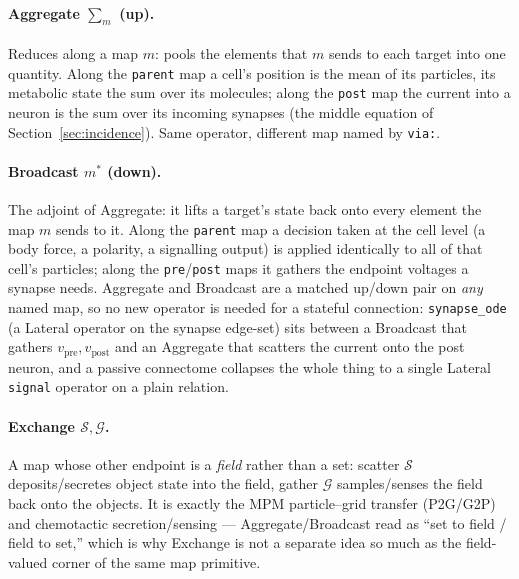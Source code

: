 \documentclass[11pt]{article}
\newcommand{\code}[1]{\texttt{#1}}
\begin{document}
\paragraph{Aggregate $\textstyle\sum_m$ (up).} Reduces along a map $m$: pools the
elements that $m$ sends to each target into one quantity. Along the \code{parent}
map a cell's position is the mean of its particles, its metabolic state the sum over
its molecules; along the \code{post} map the current into a neuron is the sum over
its incoming synapses (the middle equation of Section~\ref{sec:incidence}). Same
operator, different map named by \code{via:}.

\paragraph{Broadcast $m^{*}$ (down).} The adjoint of Aggregate: it lifts a target's
state back onto every element the map $m$ sends to it. Along the \code{parent} map a
decision taken at the cell level (a body force, a polarity, a signalling output) is
applied identically to all of that cell's particles; along the \code{pre}/\code{post}
maps it gathers the endpoint voltages a synapse needs. Aggregate and Broadcast are a
matched up/down pair on \emph{any} named map, so no new operator is needed for a
stateful connection: \code{synapse\_ode} (a Lateral operator on the synapse edge-set)
sits between a Broadcast that gathers $v_{\mathrm{pre}},v_{\mathrm{post}}$ and an
Aggregate that scatters the current onto the post neuron, and a passive connectome
collapses the whole thing to a single Lateral \code{signal} operator on a plain
relation.

\paragraph{Exchange $\mathcal{S},\mathcal{G}$.} A map whose other endpoint is a
\emph{field} rather than a set: scatter $\mathcal{S}$ deposits/secretes object state
into the field, gather $\mathcal{G}$ samples/senses the field back onto the objects.
It is exactly the MPM particle--grid transfer (P2G/G2P) and chemotactic
secretion/sensing --- Aggregate/Broadcast read as ``set to field / field to set,''
which is why Exchange is not a separate idea so much as the field-valued corner of
the same map primitive.
\end{document}

